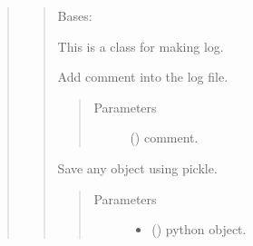 \documentclass[letterpaper,10pt,english]{sphinxmanual}
\begin{document}
\begin{quote}
\begin{quote}
\begin{fulllineitems}
\begin{quote}
\begin{description}
\end{description}\end{quote}

\end{fulllineitems}


\begin{fulllineitems}
\label{\detokenize{modules/celloracle.utility:celloracle.utility.makelog}}
Bases: 

This is a class for making log.

\begin{fulllineitems}
\label{\detokenize{modules/celloracle.utility:celloracle.utility.makelog.info}}
Add comment into the log file.
\begin{quote}\begin{description}
\item[{Parameters}] \leavevmode
{} () \textendash{} comment.

\end{description}\end{quote}

\end{fulllineitems}


\end{fulllineitems}


\begin{fulllineitems}
\label{\detokenize{modules/celloracle.utility:celloracle.utility.save_as_pickled_object}}
Save any object using pickle.
\begin{quote}\begin{description}
\item[{Parameters}] \leavevmode\begin{itemize}
\item {} 
 () \textendash{} python object.


\end{itemize}
\end{description}
\end{quote}
\end{fulllineitems}
\end{quote}
\end{quote}
\end{document}
